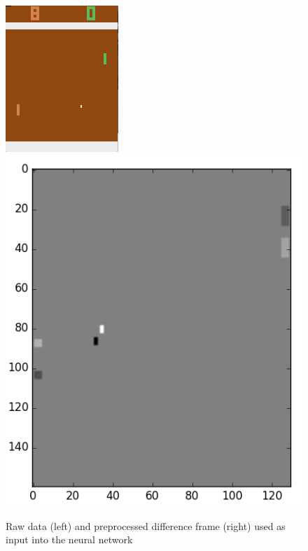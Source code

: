 \documentclass[12pt]{article}
\theoremstyle{plain}
\theoremstyle{definition}
\theoremstyle{remark}
\theoremstyle{plain}
\begin{document}
\begin{figure}[h]
\centering
\includegraphics[scale=.9]{env.png}
\includegraphics[scale=0.5]{df.png}
\newline
\centering
\caption{Raw data (left) and preprocessed difference frame (right) used as input into the neural network}\label{image}
\end{figure}
\end{document}
